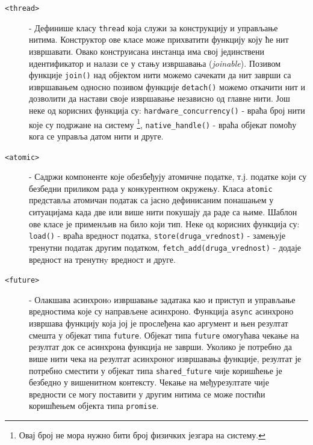 \documentclass[12pt,oneside]{memoir}
\begin{document}
\begin{description}
	\item[\texttt{<thread>}] - Дефинише класу \texttt{thread} која служи за конструкцију и управљање нитима. Конструктор ове класе може прихватити функцију коју ће нит извршавати. Овако конструисана инстанца има свој јединствени идентификатор и налази се у стању извршавања (\textit{joinable}). Позивом функције \texttt{join()} над објектом нити можемо сачекати да нит заврши са извршавањем односно позивом функције \texttt{detach()} можемо откачити нит и дозволити да настави своје извршавање независно од главне нити. Још неке од корисних функција су: \texttt{hardware\_concurrency()} - враћа број нити које су подржане на систему \footnote{Овај број не мора нужно бити број физичких језгара на систему.}, \texttt{native\_handle()} - враћа објекат помоћу кога се управља датом нити и друге.
	\item[\texttt{<atomic>}] - Садржи компоненте које обезбеђују атомичне податке, т.ј. податке који су безбедни приликом рада у конкурентном окружењу. Класа \texttt{atomic} представља атомичан податак са јасно дефинисаним понашањем у ситуацијама када две или више нити покушају да раде са њиме. Шаблон ове класе је применљив на било који тип. Неке од корисних функција су: \texttt{load()} - враћа вредност податка, \texttt{store(druga\_vrednost)} - замењује тренутни податак другим податком, \texttt{fetch\_add(druga\_vrednost)} - додаје вредност на тренутнy вредност и друге.
	\item[\texttt{<future>}] - Олакшава асинхронo извршавање задатака као и приступ и управљање вредностима које су направљене асинхроно. Функција \texttt{async} асинхроно извршава функцију која јој је прослеђена као аргумент и њен резултат смешта у објекат типа \texttt{future}. Објекат типа \texttt{future} омогућава чекање на резултат док се асинхрона функција не заврши. Уколико је потребно да више нити чека на резултат асинхроног извршавања функције, резултат је потребно сместити у објекат типа \texttt{shared\_future} чије коришћење је безбедно у вишенитном контексту. Чекање на међурезултате чије вредности се могу поставити у другим нитима се може постићи коришћењем објекта типа \texttt{promise}.    
\end{description}
\end{document}
